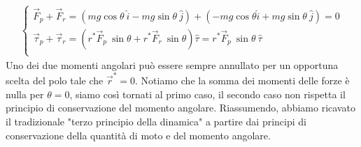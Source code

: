 \begin{align*}
\begin{cases}
	\vec{F}_p+\vec{F}_r=(mg \cos\theta\ \hat{i} - mg\sin\theta\ \hat{j})+(-mg\cos\theta \hat{i}+mg\sin\theta\ \hat{j})= 0\\
	\vec{\tau}_p+\vec{\tau}_r=(r^* \vec{F}_p\ \sin\theta+r^* \vec{F}_r\ \sin\theta)\hat{\tau}= r^* \vec{F}_p\ \sin\theta\ \hat{\tau}\\
\end{cases}
\end{align*}
Uno dei due momenti angolari può essere sempre annullato per un opportuna scelta del polo tale che $\vec{r}^*=0$. Notiamo che la somma dei momenti delle forze è nulla per $\theta = 0$, siamo così tornati al primo caso, il secondo caso non rispetta il principio di conservazione del momento angolare. Riassumendo, abbiamo ricavato il tradizionale "terzo principio della dinamica" a partire dai principi di conservazione della quantità di moto e del momento angolare. 
